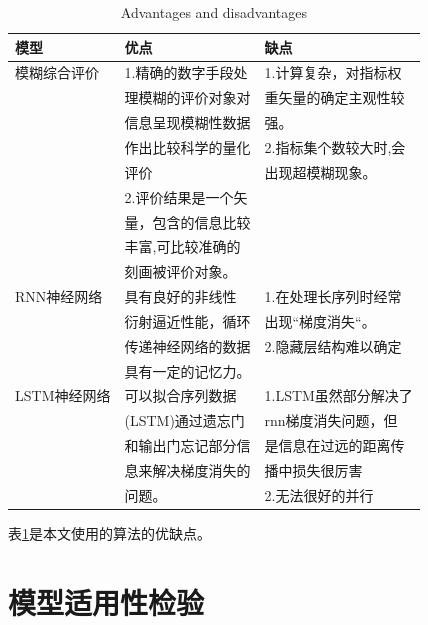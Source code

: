 \documentclass[UTF8]{ctexart}
\begin{document}
\begin{table}[htbp]
    \centering
    \caption{Advantages and disadvantages}
    \begin{tabular}{lll}
    \toprule
    模型 & 优点 & 缺点 \\
    \midrule
    模糊综合评价 & 1.精确的数字手段处& 1.计算复杂，对指标权\\
                & 理模糊的评价对象对& 重矢量的确定主观性较\\
                & 信息呈现模糊性数据& 强。\\
                & 作出比较科学的量化& 2.指标集个数较大时,会\\
                & 评价             & 出现超模糊现象。\\
                & 2.评价结果是一个矢 \\
                & 量，包含的信息比较\\
                & 丰富,可比较准确的\\
                & 刻画被评价对象。\\
    RNN神经网络  & 具有良好的非线性    &1.在处理长序列时经常\\
                & 衍射逼近性能，循环  & 出现“梯度消失“。\\
                & 传递神经网络的数据  &2.隐藏层结构难以确定\\
                & 具有一定的记忆力。 \\                  
    LSTM神经网络 & 可以拟合序列数据   & 1.LSTM虽然部分解决了\\
                &(LSTM)通过遗忘门   & rnn梯度消失问题，但\\ 
                & 和输出门忘记部分信 & 是信息在过远的距离传\\
                & 息来解决梯度消失的 & 播中损失很厉害 \\
                & 问题。            & 2.无法很好的并行 \\
    \bottomrule
    \end{tabular}
    \label{table1}
\end{table}

表\ref{table1}是本文使用的算法的优缺点。


\newpage
\section{模型适用性检验}
\end{document}
